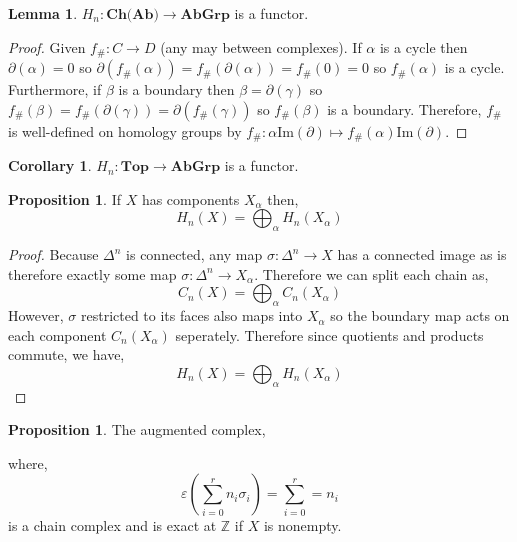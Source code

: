 \documentclass[12pt]{extarticle}
\newcommand{\Z}{\mathbb{Z}}
\newcommand{\Top}{\mathbf{Top}}
\renewcommand{\Im}[1]{\mathrm{Im}(#1)}
\theoremstyle{definition}
\newtheorem{lemma}[theorem]{Lemma}
\newtheorem{proposition}[theorem]{Proposition}
\newtheorem{corollary}[theorem]{Corollary}
\begin{document}
\begin{lemma}
$H_n : \textbf{Ch(Ab)} \to \mathbf{AbGrp}$ is a functor.
\end{lemma}

\begin{proof}
Given $f_\# : C \to D$ (any may between complexes). If $\alpha$ is a cycle then $\partial(\alpha) = 0$ so $\partial(f_\#(\alpha)) = f_\#(\partial(\alpha)) = f_\#(0) = 0$ so $f_\#(\alpha)$ is a cycle. Furthermore, if $\beta$ is a boundary then $\beta = \partial(\gamma)$ so $f_\#(\beta) = f_\#(\partial(\gamma)) = \partial(f_\#(\gamma))$ so $f_\#(\beta)$ is a boundary. Therefore, $f_\#$ is well-defined on homology groups by $f_\# : \alpha \Im{\partial} \mapsto f_\#(\alpha) \Im{\partial}$. 
\end{proof}

\begin{corollary}
$H_n : \Top \to \mathbf{AbGrp}$ is a functor.
\end{corollary}

\begin{proposition}
If $X$ has components $X_\alpha$ then,
\[H_n(X) = \bigoplus_{\alpha} H_n(X_\alpha) \] 
\end{proposition}

\begin{proof}
Because $\Delta^n$ is connected, any map $\sigma : \Delta^n \to X$ has a connected image as is therefore exactly some map $\sigma : \Delta^n \to X_\alpha$. Therefore we can split each chain as,
\[ C_n(X) = \bigoplus_{\alpha} C_n(X_\alpha) \]
However, $\sigma$ restricted to its faces also maps into $X_\alpha$ so the boundary map acts on each component $C_n(X_\alpha)$ seperately. Therefore since quotients and products commute, we have,
\[H_n(X) = \bigoplus_{\alpha} H_n(X_\alpha) \] 
\end{proof}

\begin{proposition}
The augmented complex,
\begin{center}
\end{center}
where,
\[ \varepsilon\left(\sum_{i = 0}^r n_i \sigma_i \right) = \sum_{i = 0}^r = n_i \] 
is a chain complex and is exact at $\Z$ if $X$ is nonempty.
\end{proposition}
\end{document}
